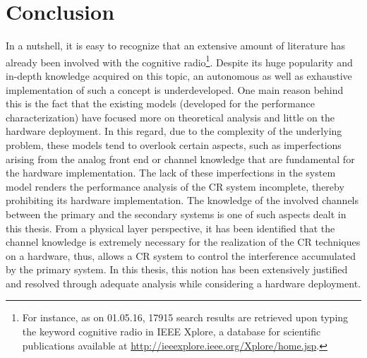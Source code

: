 \chapter{Conclusion}
\label{chap:Con}

In a nutshell, it is easy to recognize that an extensive amount of literature has already been involved with the cognitive radio\footnote{For instance, as on 01.05.16, 17915 search results are retrieved upon typing the keyword cognitive radio in IEEE Xplore, a database for scientific publications available at \url{http://ieeexplore.ieee.org/Xplore/home.jsp}.}. Despite its huge popularity and in-depth knowledge acquired on this topic, an autonomous as well as exhaustive implementation of such a concept is underdeveloped. One main reason behind this is the fact that the existing models (developed for the performance characterization) have focused more on theoretical analysis and little on the hardware deployment. In this regard, due to the complexity of the underlying problem, these models tend to overlook certain aspects, such as imperfections arising from the analog front end or channel knowledge that are fundamental for the hardware implementation. The lack of these imperfections in the system model renders the performance analysis of the CR system incomplete, thereby prohibiting its hardware implementation. The knowledge of the involved channels between the primary and the secondary systems is one of such aspects dealt in this thesis. 
From a physical layer perspective, it has been identified that the channel knowledge is extremely necessary for the realization of the CR techniques on a hardware, thus, allows a CR system to control the interference accumulated by the primary system. In this thesis, this notion has been extensively justified and resolved through adequate analysis while considering a hardware deployment. %

